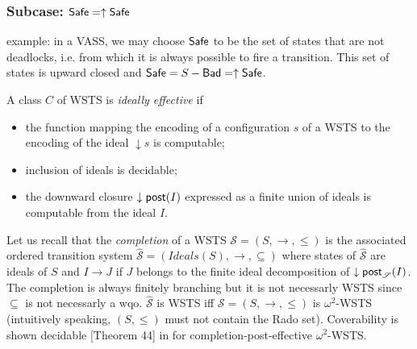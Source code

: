 
\subsubsection{Subcase: $\textsf{Safe}=\uparrow \textsf{Safe}$}

example: in a VASS, we may choose $\textsf{Safe}$ to be the set of states that are not deadlocks, i.e. from which it is always possible to fire a transition. This set of states is upward closed and $\textsf{Safe}=S-\textsf{Bad}=\uparrow \textsf{Safe}$.



%

\begin{definition}{\cite{BFM-ic17}} 
A class $C$ of WSTS is {\em ideally effective} if
\begin{itemize}
\item the function mapping the encoding of a configuration $s$ of a WSTS
to the encoding of the ideal $\downarrow s$ is computable;
\item inclusion of ideals is decidable;
\item the downward closure $\downarrow \textsf{post}(I)$ expressed as a finite union of ideals is computable from the ideal $I$.
\end{itemize}
\end{definition}

%
Let us recall that the \emph{completion}  \cite{BFM-ic17} of a WSTS $\mathscr{S}=(S,\rightarrow, \leq)$ is the associated ordered transition system $\hat{\mathscr{S}}=(Ideals(S),\rightarrow, \subseteq)$ where states of $\hat{\mathscr{S}}$ are ideals of $S$ and $I \rightarrow J$ if $J$ belongs to the finite ideal decomposition of $\downarrow \textsf{post}_{\mathscr{S}}(I)$. The completion is always finitely branching but it is not necessarly WSTS since $\subseteq$ is not necessarly a wqo. $\hat{\mathscr{S}}$ is WSTS iff $\mathscr{S}=(S,\rightarrow, \leq)$ is $\omega^2$-WSTS (intuitively speaking, $(S,\leq)$ must not contain the Rado set). Coverability is shown decidable  [Theorem 44] in \cite{BFM-ic17} for completion-post-effective $\omega^2$-WSTS.


